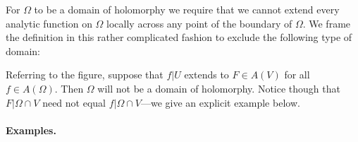 For $\Omega$ to be a domain of holomorphy we require that we cannot extend every analytic function on $\Omega$ locally across any point of the boundary of $\Omega$. We frame the definition in this rather complicated fashion to exclude the following type of domain:
\begin{center}
    \begin{minipage}{\linewidth}
        \centering
        
    \end{minipage}
\end{center}
Referring to the figure, suppose that $f|U$ extends to $F\in A(V)$ for all $f\in A(\Omega)$. Then $\Omega$ will not be a domain of holomorphy. Notice though that $F|\Omega\cap V$ need not equal $f|\Omega\cap V$---we give an explicit example below.
\paragraph*{Examples.}
